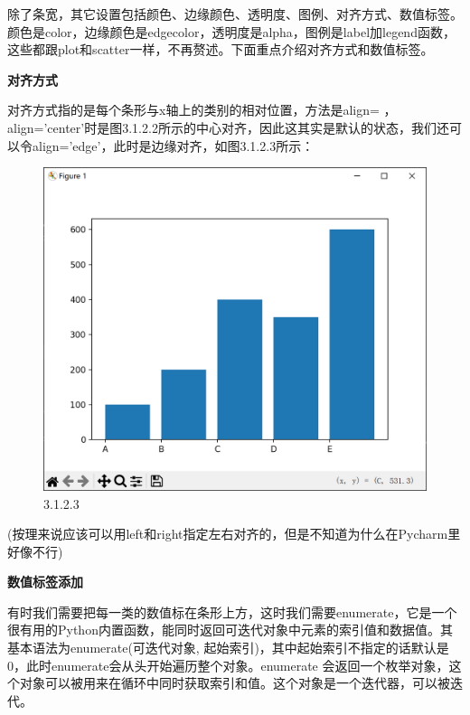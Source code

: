 \documentclass[12pt]{article}
\begin{document}
除了条宽，其它设置包括颜色、边缘颜色、透明度、图例、对齐方式、数值标签。颜色是color，边缘颜色是edgecolor，透明度是alpha，图例是label加legend函数，这些都跟plot和scatter一样，不再赘述。下面重点介绍对齐方式和数值标签。

\noindent\textbf{对齐方式}

对齐方式指的是每个条形与x轴上的类别的相对位置，方法是align= ，align='center'时是图3.1.2.2所示的中心对齐，因此这其实是默认的状态，我们还可以令align='edge'，此时是边缘对齐，如图3.1.2.3所示：
\begin{figure}[H]
    \centering
    \includegraphics[width=0.4\linewidth]{条形图 Pic2.png}
    \caption{3.1.2.3}
    \label{fig:enter-label}
\end{figure}
(按理来说应该可以用left和right指定左右对齐的，但是不知道为什么在Pycharm里好像不行)

\noindent\textbf{数值标签添加}

有时我们需要把每一类的数值标在条形上方，这时我们需要enumerate，它是一个很有用的Python内置函数，能同时返回可迭代对象中元素的索引值和数据值。其基本语法为enumerate(可迭代对象, 起始索引)，其中起始索引不指定的话默认是0，此时enumerate会从头开始遍历整个对象。enumerate 会返回一个枚举对象，这个对象可以被用来在循环中同时获取索引和值。这个对象是一个迭代器，可以被迭代。
\end{document}

